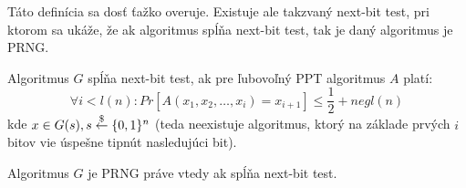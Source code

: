 Táto definícia sa dosť ťažko overuje. Existuje ale takzvaný next-bit test, 
pri ktorom sa ukáže, že ak algoritmus
spĺňa next-bit test, tak je daný algoritmus je PRNG.

\begin{definicia}
    Algoritmus $G$ spĺňa next-bit test, ak pre ľubovoľný PPT
    algoritmus $A$ platí:
    \begin{equation*}
        \forall i < l(n)\colon Pr[A(x_1, x_2, \dots, x_i) = x_{i+1}] \leq \frac{1}{2} + negl(n)
    \end{equation*}
    kde
    $x \in G(s), s \overset{\$}{\leftarrow} \{0,1\}^n$ (teda neexistuje algoritmus, ktorý na základe
    prvých $i$ bitov vie úspešne tipnút nasledujúci bit).
\end{definicia}

\begin{veta}
    Algoritmus $G$ je PRNG práve vtedy ak spĺňa next-bit test.
\end{veta}

